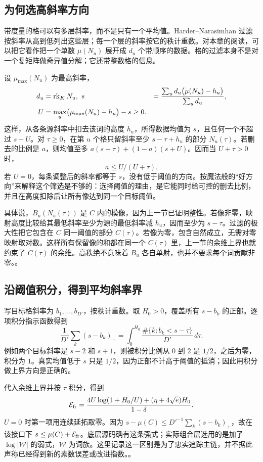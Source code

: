 \subsection{为何选高斜率方向}
带度量的格可以有多层斜率，而不是只有一个平均值。Harder--Narasimhan 过滤按斜率从高到低列出这些层；每一个层的斜率按它的秩计重数。对本章的阅读，可以把它看作把一个单数 $\mu(N_u)$ 展开成 $d_u$ 个带顺序的数据。格的过滤本身不是对一个复矩阵做奇异值分解；它还带整数格的信息。

设 $\mu_{\max}(N_u)$ 为最高斜率，
\[
\begin{aligned}
 d_u&=\operatorname{rk}_KN_u,\
 s&=\frac{\sum_u d_u\bigl(\mu(N_u)-h_u\bigr)}{\sum_u d_u},\\
 U&=\max_u\bigl(\mu_{\max}(N_u)-h_u\bigr)-s\ge0.
\end{aligned}
\]
这样，从各条源斜率中扣去该词的高度 $h_u$，所得数据均值为 $s$，且任何一个不超过 $s+U$。对 $\tau\ge0$，在第 $u$ 个格只留斜率至少 $s-\tau+h_u$ 的部分 $N_u(\tau)$。若删去的比例是 $a$，则均值至多 $a(s-\tau)+(1-a)(s+U)$。因而当 $U+\tau>0$ 时，
\[
                           a\le U/(U+\tau).
\]
若 $U=0$，每条调整后的斜率都等于 $s$，没有低于阈值的方向。按魔法般的“好方向”来解释这个筛选是不够的：选择阈值的理由，是它能同时给可控的删去比例，并且在高度扣除后让所有像达到同一个目标阈值。

具体说，$B_u(N_u(\tau))$ 是 $C$ 内的模像，因为上一节已证明整性。若像非零，映射高度比较给其最低斜率至少为源的最低斜率减 $h_u$，因而至少为 $s-\tau$。过滤的极大性把它包含在 $C$ 同一阈值的部分 $C(\tau)$。若像为零，包含自然成立，无需对零映射取对数。这样所有保留像的和都在同一个 $C(\tau)$ 里，上一节的余维上界也就约束了 $C(\tau)$ 的余维。高秩绝不意味着 $B_u$ 各自单射，也并不要求每个词贡献非零。。

\subsection{沿阈值积分，得到平均斜率界}
写目标格斜率为 $b_1,\ldots,b_{D'}$，按秩计重数。取 $H_0>0$，覆盖所有 $s-b_k$ 的正部。逐项积分指示函数得到
\[
 \frac{1}{D'}\sum_k(s-b_k)_+
 =\int_0^{H_0}\frac{\#\{k:b_k<s-\tau\}}{D'}\,d\tau.
\]
例如两个目标斜率是 $s-2$ 和 $s+1$，则被积分比例从 $0$ 到 $2$ 是 $1/2$，之后为零，积分为 $1$。真实均值低于 $s$ 只是 $1/2$，因为正部不计高于阈值的抵消；因此用积分做上界方向是正确的。

代入余维上界并按 $\tau$ 积分，得到
\[
 {\cal E}_{\mathrm{fr}}
 =\frac{4U\log(1+H_0/U)+(\eta+4\sqrt e)H_0}{1-\delta}.
\]
$U=0$ 时第一项用连续延拓取零。因为 $s-\mu(C)\le D'^{-1}\sum_k(s-b_k)_+$，故在该接口下 $s\le\mu(C)+{\cal E}_{\mathrm{fr}}$。底层源码确有这条强式；实际组合层选用的是加了 $\log|\mathcal W|$ 的弱式，$\mathcal W$ 为词族。这里记录这一区别是为了忠实追踪主链，并不据此声称已经得到新的素数误差或改进指数。。
